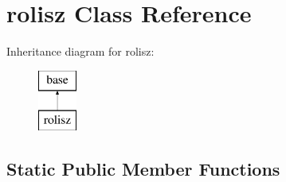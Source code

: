 \hypertarget{classrolisz}{
\section{rolisz Class Reference}
\label{classrolisz}
}
Inheritance diagram for rolisz:\begin{figure}[H]
\begin{center}
\leavevmode
\includegraphics[height=2.000000cm]{classrolisz}
\end{center}
\end{figure}
\subsection*{Static Public Member Functions}
